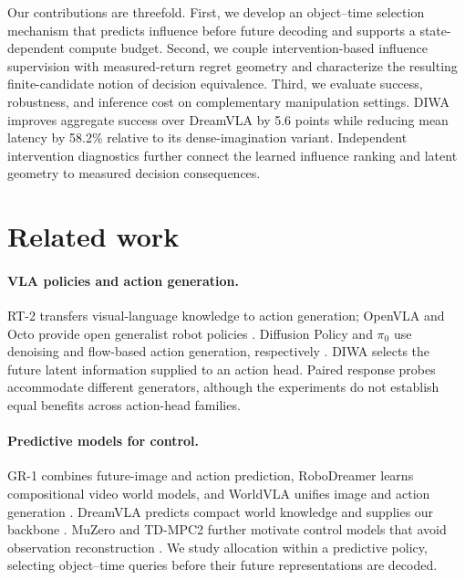 \documentclass{article}
\newcommand{\method}{DIWA}
\begin{document}
Our contributions are threefold. First, we develop an object--time selection mechanism that predicts influence before future decoding and supports a state-dependent compute budget. Second, we couple intervention-based influence supervision with measured-return regret geometry and characterize the resulting finite-candidate notion of decision equivalence. Third, we evaluate success, robustness, and inference cost on complementary manipulation settings. \method{} improves aggregate success over DreamVLA by 5.6 points while reducing mean latency by 58.2\% relative to its dense-imagination variant. Independent intervention diagnostics further connect the learned influence ranking and latent geometry to measured decision consequences.

\section{Related work}
\paragraph{VLA policies and action generation.}
RT-2 transfers visual-language knowledge to action generation; OpenVLA and Octo provide open generalist robot policies \citep{zitkovich2023rt2,kim2025openvla,ghosh2024octo}. Diffusion Policy and $\pi_0$ use denoising and flow-based action generation, respectively \citep{chi2023diffusion,black2025pi0}. \method{} selects the future latent information supplied to an action head. Paired response probes accommodate different generators, although the experiments do not establish equal benefits across action-head families.

\paragraph{Predictive models for control.}
GR-1 combines future-image and action prediction, RoboDreamer learns compositional video world models, and WorldVLA unifies image and action generation \citep{wu2024gr1,zhou2024robodreamer,cen2025worldvla}. DreamVLA predicts compact world knowledge and supplies our backbone \citep{zhang2025dreamvla}. MuZero and TD-MPC2 further motivate control models that avoid observation reconstruction \citep{schrittwieser2020muzero,hansen2024tdmpc2}. We study allocation within a predictive policy, selecting object--time queries before their future representations are decoded.
\end{document}
